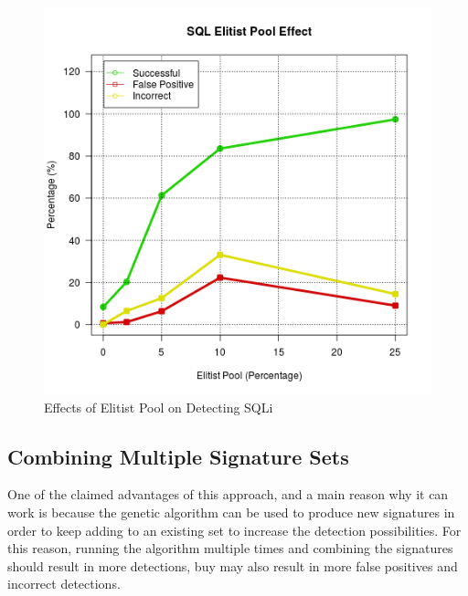 \begin{figure}
	\label{fig:resElitist}
	\includegraphics[width=450px]{./assets/results/ga/elitist/Results_SQL.png}
	\caption{Effects of Elitist Pool on Detecting SQLi}
\end{figure}

\subsection{Combining Multiple Signature Sets}

One of the claimed advantages of this approach, and a main reason why it can work is because the genetic algorithm can be used to produce new signatures in order to keep adding to an existing set to increase the detection possibilities.  For this reason, running the algorithm multiple times and combining the signatures should result in more detections, buy may also result in more false positives and incorrect detections.

